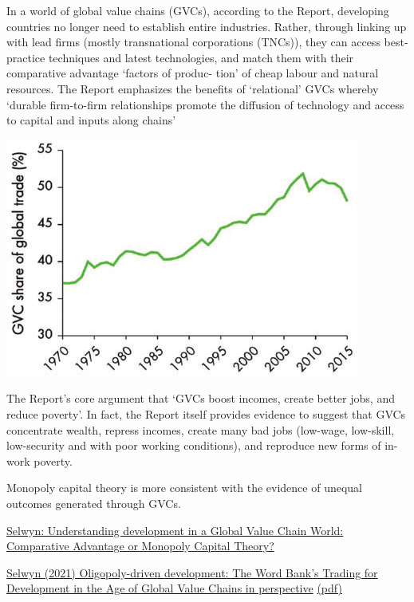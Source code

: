 \documentclass[
]{book}
\begin{document}
In a world of global value chains (GVCs), according to the Report, developing countries
no longer need to establish entire industries. Rather, through linking up with lead firms
(mostly transnational corporations (TNCs)), they can access best-practice techniques and
latest technologies, and match them with their comparative advantage `factors of produc-
tion' of cheap labour and natural resources.
The Report emphasizes the benefits of
`relational' GVCs whereby `durable firm-to-firm relationships promote the diffusion of
technology and access to capital and inputs along chains'

\includegraphics{fig/gvc_trade.png}

The Report's core argument that `GVCs boost incomes, create better jobs, and reduce poverty'.
In fact, the Report itself provides evidence to suggest that GVCs concentrate wealth, repress
incomes, create many bad jobs (low-wage, low-skill, low-security and with poor working
conditions), and reproduce new forms of in-work poverty.

Monopoly capital theory is more consistent with the evidence
of unequal outcomes generated through GVCs.

\href{https://developingeconomics.org/2021/04/22/understanding-development-in-a-global-value-chain-world-comparative-advantage-or-monopoly-capital-theory/amp/?__twitter_impression=true}{Selwyn: Understanding development in a Global Value Chain World: Comparative Advantage or Monopoly Capital Theory?}

\href{https://journals.sagepub.com/doi/full/10.1177/1024529421995351}{Selwyn (2021) Oligopoly-driven development: The Word Bank's Trading for Development in the Age of Global Value Chains in perspective}
\href{pdf/Selwyn_2021_Oligopoly-driven_Development.pdf}{(pdf)}
\end{document}

